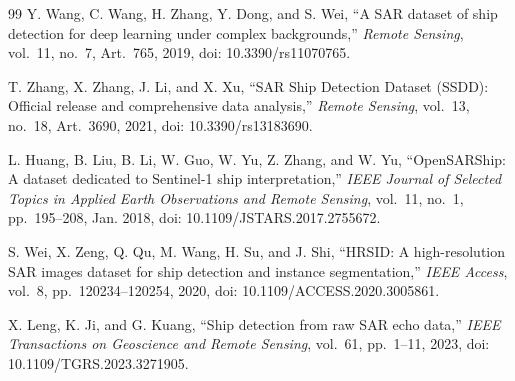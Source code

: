 \documentclass[journal]{IEEEtran}
\begin{document}
\begin{thebibliography}{99}
Y. Wang, C. Wang, H. Zhang, Y. Dong, and S. Wei, ``A SAR dataset of ship detection for deep learning under complex backgrounds,'' \emph{Remote Sensing}, vol.~11, no.~7, Art.~765, 2019, doi: 10.3390/rs11070765.

T. Zhang, X. Zhang, J. Li, and X. Xu, ``SAR Ship Detection Dataset (SSDD): Official release and comprehensive data analysis,'' \emph{Remote Sensing}, vol.~13, no.~18, Art.~3690, 2021, doi: 10.3390/rs13183690.

L. Huang, B. Liu, B. Li, W. Guo, W. Yu, Z. Zhang, and W. Yu, ``OpenSARShip: A dataset dedicated to Sentinel-1 ship interpretation,'' \emph{IEEE Journal of Selected Topics in Applied Earth Observations and Remote Sensing}, vol.~11, no.~1, pp.~195--208, Jan. 2018, doi: 10.1109/JSTARS.2017.2755672.

S. Wei, X. Zeng, Q. Qu, M. Wang, H. Su, and J. Shi, ``HRSID: A high-resolution SAR images dataset for ship detection and instance segmentation,'' \emph{IEEE Access}, vol.~8, pp.~120234--120254, 2020, doi: 10.1109/ACCESS.2020.3005861.

X. Leng, K. Ji, and G. Kuang, ``Ship detection from raw SAR echo data,'' \emph{IEEE Transactions on Geoscience and Remote Sensing}, vol.~61, pp.~1--11, 2023, doi: 10.1109/TGRS.2023.3271905.

\end{thebibliography}
\endgroup
\end{document}
